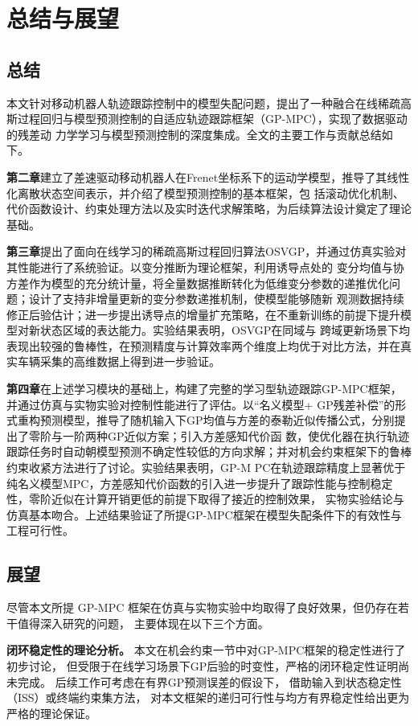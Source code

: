 \chapter{总结与展望}

\section{总结}
本文针对移动机器人轨迹跟踪控制中的模型失配问题，提出了一种融合在线稀疏高斯过程回归与模型预测控制的自适应轨迹跟踪框架（GP-MPC），实现了数据驱动的残差动
力学学习与模型预测控制的深度集成。全文的主要工作与贡献总结如下。

\textbf{第二章}建立了差速驱动移动机器人在Frenet坐标系下的运动学模型，推导了其线性化离散状态空间表示，并介绍了模型预测控制的基本框架，包
括滚动优化机制、代价函数设计、约束处理方法以及实时迭代求解策略，为后续算法设计奠定了理论基础。

\textbf{第三章}提出了面向在线学习的稀疏高斯过程回归算法OSVGP，并通过仿真实验对其性能进行了系统验证。以变分推断为理论框架，利用诱导点处的
变分均值与协方差作为模型的充分统计量，将全量数据推断转化为低维变分参数的递推优化问题；设计了支持非增量更新的变分参数递推机制，使模型能够随新
观测数据持续修正后验估计；进一步提出诱导点的增量扩充策略，在不重新训练的前提下提升模型对新状态区域的表达能力。实验结果表明，OSVGP在同域与
跨域更新场景下均表现出较强的鲁棒性，在预测精度与计算效率两个维度上均优于对比方法，并在真实车辆采集的高维数据上得到进一步验证。

\textbf{第四章}在上述学习模块的基础上，构建了完整的学习型轨迹跟踪GP-MPC框架，并通过仿真与实物实验对控制性能进行了评估。以``名义模型+
GP残差补偿''的形式重构预测模型，推导了随机输入下GP均值与方差的泰勒近似传播公式，分别提出了零阶与一阶两种GP近似方案；引入方差感知代价函
数，使优化器在执行轨迹跟踪任务时自动朝模型预测不确定性较低的方向求解；并对机会约束框架下的鲁棒约束收紧方法进行了讨论。实验结果表明，GP-M
PC在轨迹跟踪精度上显著优于纯名义模型MPC，方差感知代价函数的引入进一步提升了跟踪性能与控制稳定性，零阶近似在计算开销更低的前提下取得了接近的控制效果，
实物实验结论与仿真基本吻合。上述结果验证了所提GP-MPC框架在模型失配条件下的有效性与工程可行性。

\section{展望}

尽管本文所提 GP-MPC 框架在仿真与实物实验中均取得了良好效果，但仍存在若干值得深入研究的问题，
主要体现在以下三个方面。

\textbf{闭环稳定性的理论分析。}
本文在机会约束一节中对GP-MPC框架的稳定性进行了初步讨论，
但受限于在线学习场景下GP后验的时变性，严格的闭环稳定性证明尚未完成。
后续工作可考虑在有界GP预测误差的假设下，
借助输入到状态稳定性（ISS）或终端约束集方法，
对本文框架的递归可行性与均方有界稳定性给出更为严格的理论保证。

